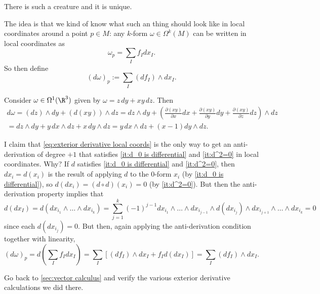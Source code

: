 \begin{proposition}\label{prop:exterior derivative existence and uniqueness}
	There is such a creature and it is unique.
\end{proposition}

The idea is that we kind of know what such an thing should look like in local coordinates around a point $p \in M$: any $k$-form $\omega \in \Omega^k(M)$ can be written in local coordinates as
\[
	\omega_p = \sum_I f_I dx_I.
\]
So then define
\begin{equation}\label{eq:exterior derivative local coords}
	(d\omega)_p := \sum_I (df_I) \wedge dx_I.
\end{equation}

\begin{example}\label{ex:1-form in R^3}
	Consider $\omega \in \Omega^1(\R^3)$ given by $\omega = z \, dy + xy \, dz$. Then
	\begin{multline*}
		d\omega = (dz) \wedge dy + (d(xy)) \wedge dz = dz \wedge dy + \left(\frac{\partial (xy)}{\partial x} dx + \frac{\partial (xy)}{\partial y} dy + \frac{\partial (xy)}{\partial z} dz\right) \wedge dz \\
		= dz \wedge dy + y\, dx \wedge dz + x \, dy \wedge dz = y\, dx \wedge dz + (x-1) dy \wedge dz.
	\end{multline*}
\end{example}

I claim that \eqref{eq:exterior derivative local coords} is the only way to get an anti-derivation of degree $+1$ that satisfies \ref{it:d_0 is differential} and \ref{it:d^2=0} in local coordinates. Why? If $d$ satisfies \ref{it:d_0 is differential} and \ref{it:d^2=0}, then $dx_i = d(x_i)$ is the result of applying $d$ to the 0-form $x_i$ (by \ref{it:d_0 is differential}), so $d(dx_i) = (d \circ d)(x_i) = 0$ (by \ref{it:d^2=0}). But then the anti-derivation property implies that
\[
	d(dx_I) = d(dx_{i_1} \wedge \dots \wedge dx_{i_k}) = \sum_{j=1}^k(-1)^{j-1} dx_{i_1} \wedge \dots \wedge dx_{i_{j-1}} \wedge d(dx_{i_j}) \wedge dx_{i_{j+1}} \wedge \dots \wedge dx_{i_k} = 0
\]
since each $d(dx_{i_j}) = 0$. But then, again applying the anti-derivation condition together with linearity,
\[
	(d\omega)_p = d\left(\sum_I f_I dx_I\right) = \sum_I \left[ (df_I) \wedge dx_I + f_I d(dx_I)\right] = \sum_I (df_I) \wedge dx_I.
\]

\begin{exercise}
	Go back to \cref{sec:vector calculus} and verify the various exterior derivative calculations we did there.
\end{exercise}

